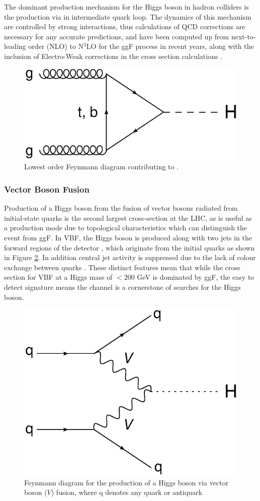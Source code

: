 		The dominant production mechanism for the Higgs boson in hadron colliders is the \ggF production via in intermediate quark loop. The dynamics of this mechanism are controlled by strong interactions, thus calculations of QCD corrections are necessary for any accurate predictions, and have been computed up from next-to-leading order (NLO) to N$^3$LO for the ggF process in recent years, along with the inclusion of Electro-Weak corrections in the cross section calculations \cite{LHCHiggsCS}. 
		
			\begin{figure}[h]
			\centering
			\includegraphics[width=0.4\linewidth]{T/FIGS/ggF}
			\caption{Lowest order Feynmann diagram contributing to \ggF.}
			\label{fig:ggf}
			\end{figure}
			
		\subsubsection{Vector Boson Fusion}
		
			Production of a Higgs boson from the fusion of vector bosons radiated from initial-state quarks is the second largest cross-section at the LHC, as is useful as a production mode due to topological characteristics which can distinguish the event from ggF. In VBF, the Higgs boson is produced along with two jets in the forward regions of the detector , which originate from the initial quarks as shown in Figure \ref{fig:vbf}. In addition central jet activity is suppressed due to the lack of colour exchange between quarks \cite{VBF2004}.  These distinct features mean that while the cross section for VBF at a Higgs mass of $< 200$ GeV is dominated by ggF, the easy to detect signature means the channel is a cornerstone of searches for the Higgs boson.
		
					\begin{figure}[h]
						\centering
						\includegraphics[width=0.4\linewidth]{T/FIGS/vbf}
						\caption{Feynmann diagram for the production of a Higgs boson via vector boson ($V$) fusion, where q denotes any quark or antiquark}
						\label{fig:vbf}
					\end{figure}
						
